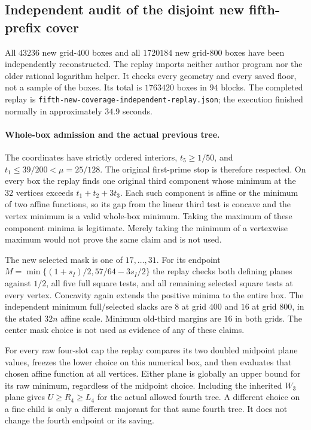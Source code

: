 \subsection{Independent audit of the disjoint new fifth-prefix cover}

All $43236$ new grid-$400$ boxes and all $1720184$ new grid-$800$
boxes have been independently reconstructed. The replay imports neither
author program nor the older rational logarithm helper. It checks
every geometry and every saved floor, not a sample of the boxes.
Its total is $1763420$ boxes in $94$ blocks. The completed replay is
\texttt{fifth-new-coverage-independent-replay.json}; the execution
finished normally in approximately $34.9$ seconds.

\paragraph{Whole-box admission and the actual previous tree.}
The coordinates have strictly ordered interiors, $t_5\ge1/50$, and
$t_1\le39/200<\mu=25/128$. The original first-prime stop is therefore
respected. On every box the replay finds one original third component
whose minimum at the $32$ vertices exceeds $t_1+t_2+3t_3$.
Each such component is affine or the minimum of two affine functions,
so its gap from the linear third test is concave and the vertex minimum
is a valid whole-box minimum. Taking the maximum of these component
minima is legitimate. Merely taking the minimum of a vertexwise maximum
would not prove the same claim and is not used.

The new selected mask is one of $17,\ldots,31$. For its endpoint
$M=\min\{(1+s_I)/2,57/64-3s_I/2\}$ the replay checks both defining
planes against $1/2$, all five full square tests, and all remaining
selected square tests at every vertex. Concavity again extends the
positive minima to the entire box. The independent minimum full/selected
slacks are $8$ at grid $400$ and $16$ at grid $800$, in the stated
$32n$ affine scale. Minimum old-third margins are $16$ in both grids.
The center mask choice is not used as evidence of any of these claims.

For every raw four-slot cap the replay compares its two doubled
midpoint plane values, freezes the lower choice on this numerical box,
and then evaluates that chosen affine function at all vertices.
Either plane is globally an upper bound for its raw minimum, regardless
of the midpoint choice. Including the inherited $W_3$ plane gives
$U\ge R_4\ge L_4$ for the actual allowed fourth tree. A different
choice on a fine child is only a different majorant for that same
fourth tree. It does not change the fourth endpoint or its saving.

